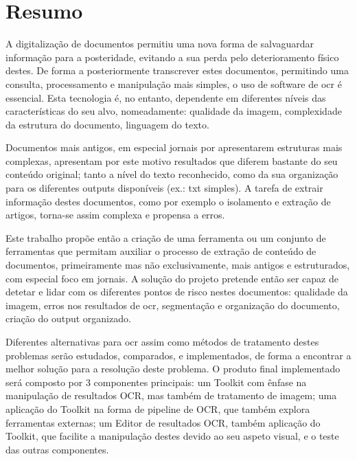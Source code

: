 \chapter*{Resumo}


A digitalização de documentos permitiu uma nova forma de salvaguardar informação para a posteridade, evitando a sua perda pelo deterioramento físico destes. De forma a posteriormente transcrever estes documentos, permitindo uma consulta, processamento e manipulação mais simples, o uso de software de \acrshort{ocr} é essencial. Esta tecnologia é, no entanto, dependente em diferentes níveis das características do seu alvo, nomeadamente: qualidade da imagem, complexidade da estrutura do documento, linguagem do texto. 

Documentos mais antigos, em especial jornais por apresentarem estruturas mais complexas, apresentam por este motivo resultados que diferem bastante do seu conteúdo original; tanto a nível do texto reconhecido, como da sua organização para os diferentes outputs disponíveis (ex.: txt simples). A tarefa de extrair informação destes documentos, como por exemplo o isolamento e extração de artigos, torna-se assim complexa e propensa a erros. 

Este trabalho propõe então a criação de uma ferramenta ou um conjunto de ferramentas que permitam auxiliar o processo de extração de conteúdo de documentos, primeiramente mas não exclusivamente, mais antigos e estruturados, com especial foco em jornais. A solução do projeto pretende então ser capaz de detetar e lidar com os diferentes pontos de risco nestes documentos: qualidade da imagem, erros nos resultados de \acrshort{ocr}, segmentação e organização do documento, criação do output organizado. 

Diferentes alternativas para \acrshort{ocr} assim como métodos de tratamento destes problemas serão estudados, comparados, e implementados, de forma a encontrar a melhor solução para a resolução deste problema. O produto final implementado será composto por 3 componentes principais: um Toolkit com ênfase na manipulação de resultados OCR, mas também de tratamento de imagem; uma aplicação do Toolkit na forma de pipeline de OCR, que também explora ferramentas externas; um Editor de resultados OCR, também aplicação do Toolkit, que facilite a manipulação destes devido ao seu aspeto visual, e o teste das outras componentes. 

